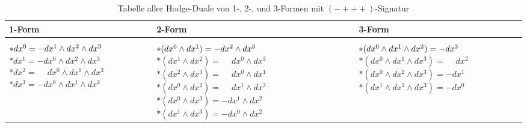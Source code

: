 \begin{table}[b]
	\centering
	\begin{tabularx}{\textwidth}{ 
			| >{\centering\arraybackslash}X 
			| >{\centering\arraybackslash}X 
			| >{\centering\arraybackslash}X | }
		\hline
		\textbf{1-Form} & \textbf{2-Form} & \textbf{3-Form} \\
		\hline
		\( \rule{0pt}{1.5em} {\ast} dx^0 = -dx^1 \wedge dx^2 \wedge dx^3 \) \newline
	\( {\ast} dx^1 = -dx^0 \wedge dx^2 \wedge dx^3 \) \newline
	\( {\ast} dx^2 = \phantom{-} dx^0 \wedge dx^1 \wedge dx^3 \) \newline
	\( {\ast} dx^3 = -dx^0 \wedge dx^1 \wedge dx^2 \, \) 
	&
	\( \rule{0pt}{1.5em} {\ast} (dx^0 \wedge dx^1) = -dx^2 \wedge dx^3 \) \newline
	\( {\ast} (dx^1 \wedge dx^2) = \phantom{-} dx^0 \wedge dx^3 \) \newline
	\( {\ast} (dx^2 \wedge dx^3) = \phantom{-} dx^0 \wedge dx^1 \) \newline
	\( {\ast} (dx^0 \wedge dx^2) = \phantom{-} dx^1 \wedge dx^3 \) \newline
	\( {\ast} (dx^0 \wedge dx^3) = -dx^1 \wedge dx^2 \) \newline
	\( {\ast} (dx^1 \wedge dx^3) = -dx^0 \wedge dx^2 \)
	&
	\( \rule{0pt}{1.5em} {\ast} (dx^0 \wedge dx^1 \wedge dx^2) = -dx^3 \) \newline
	\( {\ast} (dx^0 \wedge dx^1 \wedge dx^3) = \phantom{-} dx^2 \) \newline
	\( {\ast} (dx^0 \wedge dx^2 \wedge dx^3) = -dx^1 \) \newline
	\( {\ast} (dx^1 \wedge dx^2 \wedge dx^3) = -dx^0 \)
		\\
		\hline
	\end{tabularx}
	\caption{Tabelle aller Hodge-Duale von 1-, 2-, und 3-Formen mit $({-}{+}{+}{+})$-Signatur}
	\label{maxwell:section:teil1:Hodge-Tabelle}
\end{table}
